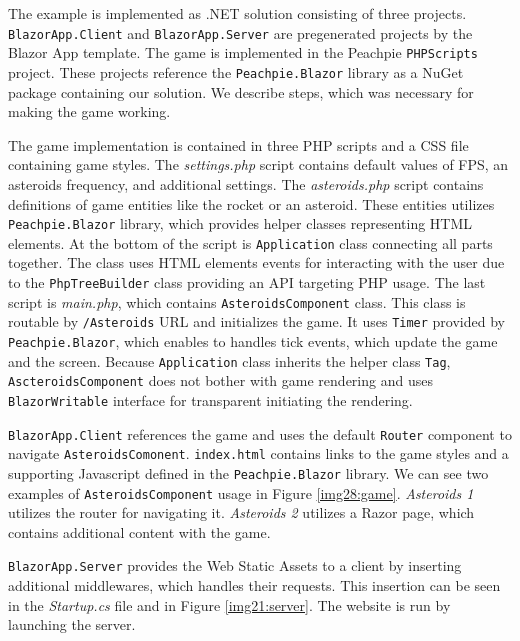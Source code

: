 \par
The example is implemented as .NET solution consisting of three projects. 
\texttt{BlazorApp.Client} and \texttt{BlazorApp.Server} are pregenerated projects by the Blazor App template.
The game is implemented in the Peachpie \texttt{PHPScripts} project.
These projects reference the \texttt{Peachpie.Blazor} library as a NuGet package containing our solution. 
We describe steps, which was necessary for making the game working.
\par
The game implementation is contained in three PHP scripts and a CSS file containing game styles.
The \textit{settings.php} script contains default values of FPS, an asteroids frequency, and additional settings.
The \textit{asteroids.php} script contains definitions of game entities like the rocket or an asteroid.
These entities utilizes \texttt{Peachpie.Blazor} library, which provides helper classes representing HTML elements.
At the bottom of the script is \texttt{Application} class connecting all parts together.
The class uses HTML elements events for interacting with the user due to the \texttt{PhpTreeBuilder} class providing an API targeting PHP usage.
The last script is \textit{main.php}, which contains \texttt{AsteroidsComponent} class.
This class is routable by \texttt{/Asteroids} URL and initializes the game.
It uses \texttt{Timer} provided by \texttt{Peachpie.Blazor}, which enables to handles tick events, which update the game and the screen.
Because \texttt{Application} class inherits the helper class \texttt{Tag}, \texttt{AscteroidsComponent} does not bother with game rendering and uses \texttt{BlazorWritable} interface for transparent initiating the rendering.
\par
\texttt{BlazorApp.Client} references the game and uses the default \texttt{Router} component to navigate \texttt{AsteroidsComonent}.
\texttt{index.html} contains links to the game styles and a supporting Javascript defined in the \texttt{Peachpie.Blazor} library.
We can see two examples of \texttt{AsteroidsComponent} usage in Figure \ref{img28:game}.
\textit{Asteroids 1} utilizes the router for navigating it.
\textit{Asteroids 2} utilizes a Razor page, which contains additional content with the game.
\par
\texttt{BlazorApp.Server} provides the Web Static Assets to a client by inserting additional middlewares, which handles their requests.
This insertion can be seen in the \textit{Startup.cs} file and in Figure \ref{img21:server}.
The website is run by launching the server.
\par

